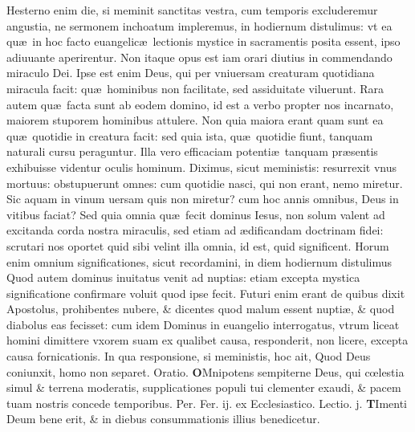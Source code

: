 \documentclass[a5paper,10pt]{book}
\def\leftmarginnote{%
	\lrmarginnote{\hskip -\marginparsep \hskip -6.5em}}
\def\ae{æ}
\def\oe{œ}
\begin{document}
\begin{multicols*}{2}
Hesterno enim die, si meminit sanctitas vestra, cum temporis excluderemur angustia, ne sermonem inchoatum impleremus, in hodiernum distulimus: vt ea qu\ae \ in hoc facto euangelic\ae \ lectionis mystice in sacramentis posita essent, ipso adiuuante aperirentur.
Non itaque opus est iam orari diutius in commendando miraculo Dei. Ipse est enim Deus, qui per vniuersam creaturam quotidiana miracula facit: qu\ae \ hominibus non facilitate, sed assiduitate viluerunt.
Rara autem qu\ae \ facta sunt ab eodem domino, id est a verbo propter nos incarnato, maiorem stuporem hominibus attulere.
Non quia maiora erant quam sunt ea qu\ae \ quotidie in creatura facit: sed quia ista, qu\ae \ quotidie fiunt, tanquam naturali cursu peraguntur.
Illa vero efficaciam potenti\ae \ tanquam pr\ae sentis exhibuisse videntur oculis hominum.
Diximus, sicut meministis: resurrexit vnus mortuus: obstupuerunt omnes: cum quotidie nasci, qui non erant, nemo miretur.
Sic aquam in vinum uersam quis non miretur? cum hoc annis omnibus, Deus in vitibus faciat? Sed quia omnia qu\ae \ fecit dominus Iesus, non solum valent ad excitanda corda nostra miraculis, sed etiam ad \ae dificandam doctrinam fidei: scrutari nos oportet quid sibi velint illa omnia, id est, quid significent.
Horum enim omnium significationes, sicut recordamini, in diem hodiernum distulimus Quod autem dominus inuitatus venit ad nuptias: etiam excepta mystica significatione confirmare voluit quod ipse fecit.
Futuri enim erant de quibus dixit Apostolus, prohibentes nubere, \& dicentes quod malum essent nupti\ae , \& quod diabolus eas fecisset: cum idem Dominus in euangelio interrogatus, vtrum liceat homini dimittere vxorem suam ex qualibet causa, responderit, non licere, excepta causa fornicationis.
In qua responsione, si meministis, hoc ait, Quod Deus coniunxit, homo non separet. \color{red} Oratio. \color{black}
\vspace{-.25em}
\lettrine[lines=2]{\bfseries \color{red} O}{}Mnipotens sempiterne Deus, qui c\oe lestia simul \& terrena moderatis, supplicationes populi tui clementer exaudi, \& pacem tuam nostris concede temporibus. Per.
\newline {} \color{red} \hypertarget{MON-PRIMA-VAGAN}{Fer. ij.} ex Ecclesiastico. Lectio. j. \color{black}
\vspace{-.25em}
\lettrine[lines=2]{\bfseries T}{}Imenti\leftmarginnote{\begin{flushright}ca. 1.\end{flushright}} Deum bene erit, \& in diebus consummationis illius benedicetur.

\end{multicols*}
\end{document}
